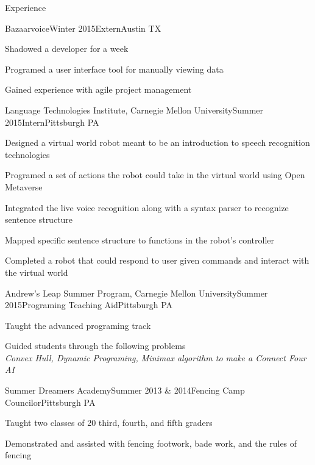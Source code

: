 \documentclass[12pt]{resume} %
\begin{document}
\begin{rSection}{Experience}

\begin{rSubsection}{Bazaarvoice}{Winter 2015}{Extern}{Austin TX}
        \item Shadowed a developer for a week
        \item Programed a user interface tool for manually viewing data
        \item Gained experience with agile project management
\end{rSubsection}


\begin{rSubsection}{Language Technologies Institute, Carnegie Mellon
    University}{Summer 2015}{Intern}{Pittsburgh PA}
        \item Designed a virtual world robot meant to be an introduction
            to speech recognition technologies
        \item Programed a set of actions the robot could take in the
            virtual world using Open Metaverse
        \item Integrated the live voice recognition along with a syntax
    parser to recognize sentence structure
        \item Mapped specific sentence structure to functions in the
    robot's controller
        \item Completed a robot that could respond to user given commands
    and interact with the virtual world
\end{rSubsection}


\begin{rSubsection}{Andrew's Leap Summer Program, Carnegie Mellon
    University}{Summer 2015}{Programing Teaching Aid}{Pittsburgh PA}
        \item Taught the advanced programing track
        \item Guided students through the following problems\\
                {\em Convex Hull, Dynamic Programing, Minimax algorithm to make a Connect Four AI }
\end{rSubsection}

\begin{rSubsection}{Summer Dreamers Academy}{Summer 2013 \&
2014}{Fencing Camp Councilor}{Pittsburgh PA}
        \item Taught two classes of 20 third, fourth, and fifth graders
        \item Demonstrated and assisted with fencing footwork, bade work, and the rules of fencing
\end{rSubsection}

\end{rSection}
\end{document}
